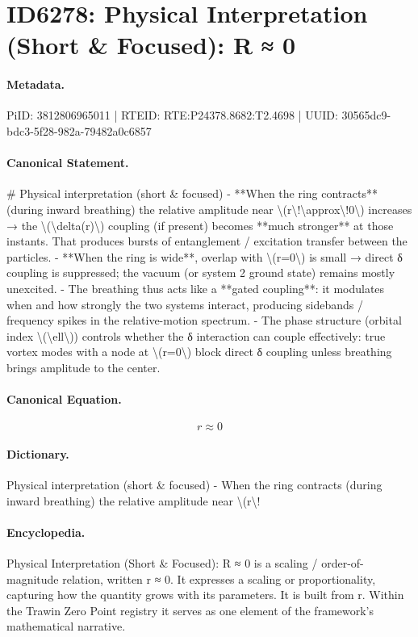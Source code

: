 \section*{ID6278: Physical Interpretation (Short \& Focused): R ≈ 0}
\paragraph{Metadata.}
PiID: 3812806965011 | RTEID: RTE:P24378.8682:T2.4698 | UUID: 30565dc9-bdc3-5f28-982a-79482a0c6857

\paragraph{Canonical Statement.}
\# Physical interpretation (short \& focused) - **When the ring contracts** (during inward breathing) the relative amplitude near \textbackslash{}(r\textbackslash{}!\textbackslash{}approx\textbackslash{}!0\textbackslash{}) increases → the \textbackslash{}(\textbackslash{}delta(r)\textbackslash{}) coupling (if present) becomes **much stronger** at those instants. That produces bursts of entanglement / excitation transfer between the particles. - **When the ring is wide**, overlap with \textbackslash{}(r=0\textbackslash{}) is small → direct δ coupling is suppressed; the vacuum (or system 2 ground state) remains mostly unexcited. - The breathing thus acts like a **gated coupling**: it modulates when and how strongly the two systems interact, producing sidebands / frequency spikes in the relative-motion spectrum. - The phase structure (orbital index \textbackslash{}(\textbackslash{}ell\textbackslash{})) controls whether the δ interaction can couple effectively: true vortex modes with a node at \textbackslash{}(r=0\textbackslash{}) block direct δ coupling unless breathing brings amplitude to the center.

\paragraph{Canonical Equation.}
\[
r\!\approx\!0
\]

\paragraph{Dictionary.}
Physical interpretation (short \& focused) - When the ring contracts (during inward breathing) the relative amplitude near \textbackslash{}(r\textbackslash{}!

\paragraph{Encyclopedia.}
Physical Interpretation (Short \& Focused): R ≈ 0 is a scaling / order-of-magnitude relation, written r ≈ 0. It expresses a scaling or proportionality, capturing how the quantity grows with its parameters. It is built from r. Within the Trawin Zero Point registry it serves as one element of the framework's mathematical narrative.
